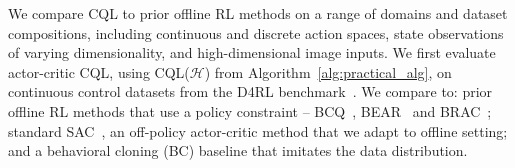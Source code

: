 We compare CQL to prior offline RL methods on a range of domains and dataset compositions, including continuous and discrete action spaces, state observations of varying dimensionality, and high-dimensional image inputs. We first evaluate actor-critic CQL, using CQL($\mathcal{H}$) from Algorithm~\ref{alg:practical_alg}, on continuous control datasets from the D4RL benchmark~\citep{d4rl}.
We compare to: prior offline RL methods that use a policy constraint -- BCQ~\citep{fujimoto2018off}, BEAR~\citep{kumar2019stabilizing} and BRAC~\citep{wu2019behavior}; standard SAC~\citep{haarnoja}, an off-policy actor-critic method that we adapt to offline setting; and a behavioral cloning (BC) baseline that imitates the data distribution. 

